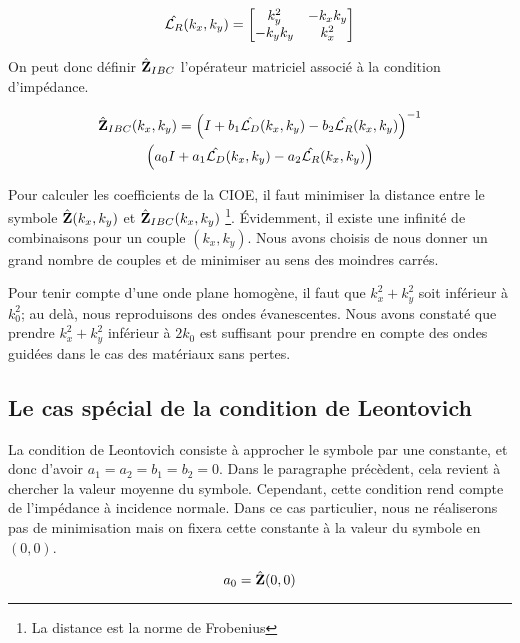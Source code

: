     \begin{equation}
      \hat{{\mathcal{L}_R}}(k_x,k_y) = 
      \begin{bmatrix}
        k_y^2 & -k_x k_y 
        \\
        -k_y k_y & k_x^2
      \end{bmatrix}
    \end{equation}

    On peut donc définir \(\hat{\mathbf{Z}}_{IBC}\) l’opérateur matriciel associé à la condition d'impédance. 

    \begin{multline}
        \hat{\mathbf{Z}}_{IBC}(k_x,k_y) = \left(I + b_1 \hat{{\mathcal{L}_D}}(k_x,k_y) - b_2 \hat{{\mathcal{L}_R}}(k_x,k_y) \right)^{-1} \\ \left(a_0 I + a_1 \hat{{\mathcal{L}_D}}(k_x,k_y) - a_2 \hat{{\mathcal{L}_R}}(k_x,k_y)\right)
    \end{multline}

    Pour calculer les coefficients de la CIOE, il faut minimiser la distance entre le symbole \(\hat{\mathbf{Z}}(k_x,k_y)\) et \(\hat{\mathbf{Z}}_{IBC}(k_x,k_y)\) \footnote{La distance est la norme de Frobenius}. Évidemment, il existe une infinité de combinaisons pour un couple \((k_x,k_y)\). Nous avons choisis de nous donner un grand nombre de couples et de minimiser au sens des moindres carrés.

    Pour tenir compte d'une onde plane homogène, il faut que \(k_x^2 + k_y^2\) soit inférieur à \(k_0^2\); au delà, nous reproduisons des ondes évanescentes. Nous avons constaté que prendre \(k_x^2 + k_y^2\) inférieur à \(2k_0\) est suffisant pour prendre en compte des ondes guidées dans le cas des matériaux sans pertes.

  \subsection{Le cas spécial de la condition de Leontovich}

    La condition de Leontovich consiste à approcher le symbole par une constante, et donc d'avoir \(a_1=a_2=b_1=b_2=0\). Dans le paragraphe précèdent, cela revient à chercher la valeur moyenne du symbole. Cependant, cette condition rend compte de l'impédance à incidence normale. Dans ce cas particulier, nous ne réaliserons pas de minimisation mais on fixera cette constante à la valeur du symbole en \((0,0)\).

    \begin{equation}
      a_0 = \hat{\mathbf{Z}}(0,0)
    \end{equation}

